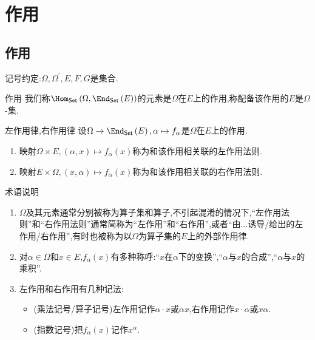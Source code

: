 \chapter{作用}

\section{作用}

记号约定:$\Omega,\Omega^{\prime},E,F,G$是集合.

\begin{definition}{作用}{}
	我们称$\Hom_{\mathsf{Set}}\left(\Omega,\End_{\mathsf{Set}}\left(E\right)\right)$的元素是$\Omega$在$E$上的作用,称配备该作用的$E$是$\Omega$-集.
\end{definition}

\begin{definition}{左作用律,右作用律}{}
	设$\Omega\to\End_{\mathsf{Set}}\left(E\right),\alpha\mapsto f_{\alpha}$是$\Omega$在$E$上的作用.
	\begin{enumerate}
		\item 映射$\Omega\times E,\left(\alpha,x\right)\mapsto f_{\alpha}\left(x\right)$称为和该作用相关联的左作用法则.
		\item 映射$E\times\Omega,\left(x,\alpha\right)\mapsto f_{\alpha}\left(x\right)$称为和该作用相关联的右作用法则.
	\end{enumerate}
\end{definition}

\begin{remark}{术语说明}{}
	\begin{enumerate}
		\item $\Omega$及其元素通常分别被称为算子集和算子,不引起混淆的情况下,``左作用法则''和``右作用法则''通常简称为``左作用''和``右作用'',或者``由$\ldots$诱导/给出的左作用/右作用'',有时也被称为以$\Omega$为算子集的$E$上的外部作用律.
		\item 对$\alpha\in\Omega$和$x\in E$,$f_{\alpha}\left(x\right)$有多种称呼:``$x$在$\alpha$下的变换'',``$\alpha$与$x$的合成'',``$\alpha$与$x$的乘积''.
		\item 左作用和右作用有几种记法:
		\begin{itemize}
			\item (乘法记号/算子记号)左作用记作$\alpha\cdot x$或$\alpha x$,右作用记作$x\cdot\alpha$或$x\alpha$.
			\item (指数记号)把$f_{\alpha}\left(x\right)$记作$x^{\alpha}$.
		\end{itemize}
	\end{enumerate}	
\end{remark}

